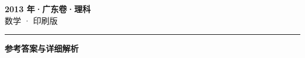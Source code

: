 \documentclass[zihao=5, a4paper]{ctexart}
\begin{document}
\begin{center}
  {\Large\bfseries 2013 年·广东卷·理科}\\[4pt]
  {\large 数学 · 印刷版}
\end{center}
\medskip
{}

\par\bigskip\hrule\bigskip
{}
\Needspace{0.55\textheight}
\begin{center}{\large\bfseries 参考答案与详细解析}\end{center}
\smallskip

\end{document}
